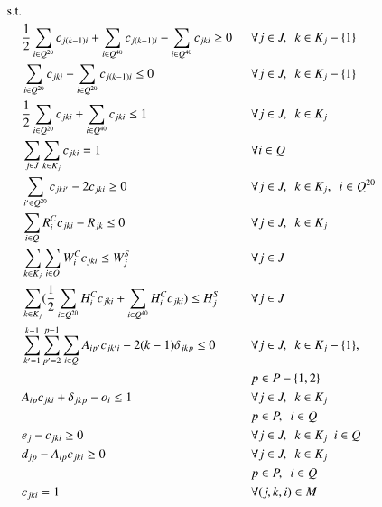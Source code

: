 \documentclass[preprint,12pt,3p]{elsarticle}
\begin{document}
\begin{alignat}{15}    
    \text{s.t.} & & \nonumber \\
                & \frac{1}{2} \sum_{i \in Q^{20}} c_{j(k-1)i} + \sum_{i \in Q^{40}} c_{j(k-1)i} - \sum_{i \in Q^{40}} c_{jki} \geq 0 \enskip && \forall j \in J, \enskip k \in K_j - \{1\} \label{eq:constr1}\\
                & \sum_{i \in Q^{20}} c_{jki} - \sum_{i \in Q^{20}} c_{j(k-1)i} \leq  0 && \forall j \in J, \enskip k \in K_j - \{1\} \label{eq:constr2}\\
                & \frac{1}{2} \sum_{i \in Q^{20}} c_{jki} + \sum_{i \in Q^{40}} c_{jki} \leq  1 && \forall j \in J, \enskip k \in K_j \label{eq:constr3}\\
                & \sum_{j \in J} \sum_{k \in K_j} c_{jki} = 1 && \forall i \in Q \label{eq:constr4}\\
                & \sum_{i' \in Q^{20}} c_{jki'} - 2c_{jki} \geq  0 && \forall j \in J, \enskip  k \in K_j, \enskip i \in Q^{20} \label{eq:constr5}\\
                & \sum_{i \in Q} R^{C}_{i}c_{jki} - R_{jk} \leq  0 && \forall j \in J, \enskip k \in K_j \label{eq:constr6}\\
                & \sum_{k \in K_j} \sum_{i \in Q}  W^{C}_{i}c_{jki} \leq W^{S}_{j} && \forall j \in J \label{eq:constr7}\\
                & \sum_{k \in K_j} (\frac{1}{2} \sum_{i \in Q^{20}} H^{C}_{i}c_{jki} + \sum_{i \in Q^{40}} H^{C}_{i}c_{jki}) \leq H^{S}_{j} && \forall j \in J \label{eq:constr8}\\
                & \sum_{k'=1}^{k-1} \sum_{p'=2}^{p-1} \sum_{i \in Q} A_{ip'}c_{jk'i} - 2(k - 1)\delta_{jkp} \leq 0 && \forall j \in J, \enskip  k \in K_j - \{1\},  \label{eq:constr9}\\
                & && p \in P - \{1, 2\} \nonumber\\
                & A_{ip}c_{jki} +  \delta_{jkp} - o_i \leq  1 && \forall j \in J, \enskip k \in K_j \label{eq:constr10}\\
                & && p \in P, \enskip i \in Q \nonumber\\
                & e_j - c_{jki} \geq  0 && \forall j \in J, \enskip k \in K_j \enskip i \in Q \label{eq:constr11}\\
                & d_{jp} - A_{ip}c_{jki}  \geq  0 && \forall j \in J, \enskip k \in K_j \label{eq:constr12}\\ 
                & && p \in P, \enskip i \in Q \nonumber\\
                & c_{jki} = 1 && \forall (j,k,i) \in M \label{eq:constr13}
\end{alignat}
\normalsize
\end{document}
